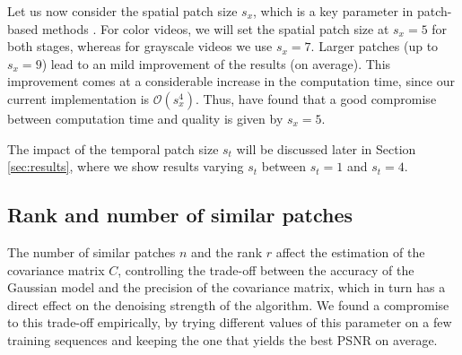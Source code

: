 \documentclass[10pt, journal, twocolumn, final, a4paper]{IEEEtran}
\newcommand{\pcomment}[1]{}
\newcommand{\ma}[1]{\boldsymbol{#1}}
\begin{document}
Let us now consider the spatial patch
size $s_x$, which is a key parameter in patch-based methods \cite{Buades2006,Kervrann2006,Boulanger2007}.
%
For color videos, we will set the spatial patch size at $s_x = 5$ for both
stages, whereas for grayscale videos we use $s_x = 7$. Larger patches (up to $s_x = 9$) lead to an mild improvement of the
results (on average). This improvement comes at a considerable increase in the
computation time, since our current implementation is $\mathcal O(s_x^4)$.
Thus, have found that a good compromise between computation time and quality is
given by $s_x = 5$.

The impact of the temporal patch size $s_t$ will be discussed later in Section
\ref{sec:results}, where we show results varying $s_t$ between $s_t = 1$ and $s_t = 4$.

\subsection{Rank and number of similar patches}

The number of similar patches $n$ and the rank $r$ affect the estimation of the covariance
matrix $C$, controlling the trade-off between the accuracy of the Gaussian model
and the precision of the covariance matrix,
which in turn has a direct effect on the denoising strength of the algorithm.
We found a compromise to this trade-off empirically, by trying different values
of this parameter on a few training sequences and keeping the one that yields
the best PSNR on average.
\end{document}
